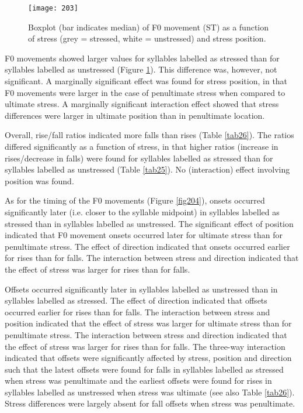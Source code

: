 \begin{figure}[t]
\texttt{[image: 203]}
\caption{Boxplot (bar indicates median) of F0 movement (ST) as a function of stress (grey = stressed, white = unstressed) and stress position.}
\label{fig203}
\end{figure}

F0 movements showed larger values for syllables labelled as stressed than for syllables labelled as unstressed (Figure \ref{fig203}). This difference was, however, not significant. A marginally significant effect was found for stress position, in that F0 movements were larger in the case of penultimate stress when compared to ultimate stress. A marginally significant interaction effect showed that stress differences were larger in ultimate position than in penultimate location.\par

Overall, rise/fall ratios indicated more falls than rises (Table \ref{tab26}). The ratios differed significantly as a function of stress, in that higher ratios (increase in rises/decrease in falls) were found for syllables labelled as stressed than for syllables labelled as unstressed (Table \ref{tab25}). No (interaction) effect involving position was found.\par

As for the timing of the F0 movements (Figure \ref{fig204}), onsets occurred significantly later (i.e. closer to the syllable midpoint) in syllables labelled as stressed than in syllables labelled as unstressed. The significant effect of position indicated that F0 movement onsets occurred later for ultimate stress than for penultimate stress. The effect of direction indicated that onsets occurred earlier for rises than for falls. The interaction between stress and direction indicated that the effect of stress was larger for rises than for falls.\par

Offsets occurred significantly later in syllables labelled as unstressed than in syllables labelled as stressed. The effect of direction indicated that offsets occurred earlier for rises than for falls. The interaction between stress and position indicated that the effect of stress was larger for ultimate stress than for penultimate stress. The interaction between stress and direction indicated that the effect of stress was larger for rises than for falls. The three-way interaction indicated that offsets were significantly affected by stress, position and direction such that the latest offsets were found for falls in syllables labelled as stressed when stress was penultimate and the earliest offsets were found for rises in syllables labelled as unstressed when stress was ultimate (see also Table \ref{tab26}). Stress differences were largely absent for fall offsets when stress was penultimate.\par

